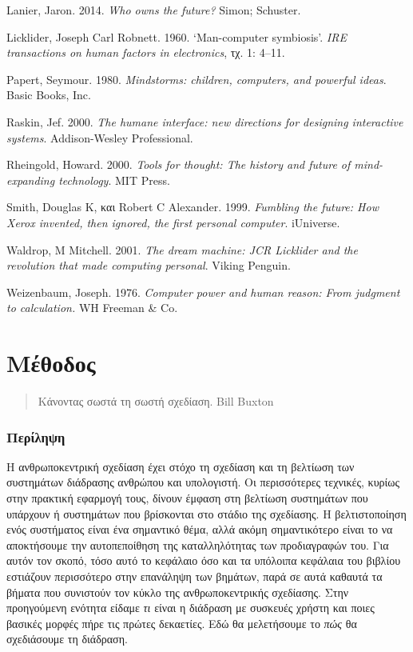 \documentclass[
]{article}
\begin{document}
Lanier, Jaron. 2014. \emph{Who owns the future?} Simon; Schuster.

Licklider, Joseph Carl Robnett. 1960. {`Man-computer symbiosis'}.
\emph{IRE transactions on human factors in electronics}, τχ. 1: 4--11.

Papert, Seymour. 1980. \emph{Mindstorms: children, computers, and
powerful ideas}. Basic Books, Inc.

Raskin, Jef. 2000. \emph{The humane interface: new directions for
designing interactive systems}. Addison-Wesley Professional.

Rheingold, Howard. 2000. \emph{Tools for thought: The history and future
of mind-expanding technology}. MIT Press.

Smith, Douglas K, και Robert C Alexander. 1999. \emph{Fumbling the
future: How Xerox invented, then ignored, the first personal computer}.
iUniverse.

Waldrop, M Mitchell. 2001. \emph{The dream machine: JCR Licklider and
the revolution that made computing personal}. Viking Penguin.

Weizenbaum, Joseph. 1976. \emph{Computer power and human reason: From
judgment to calculation.} WH Freeman \& Co.

\hypertarget{ux3bcux3adux3b8ux3bfux3b4ux3bfux3c2}{%
\section{Μέθοδος}\label{ux3bcux3adux3b8ux3bfux3b4ux3bfux3c2}}

\begin{quote}
Κάνοντας σωστά τη σωστή σχεδίαση. Bill Buxton
\end{quote}

\hypertarget{ux3c0ux3b5ux3c1ux3afux3bbux3b7ux3c8ux3b7}{%
\subsubsection{Περίληψη}\label{ux3c0ux3b5ux3c1ux3afux3bbux3b7ux3c8ux3b7}}

Η ανθρωποκεντρική σχεδίαση έχει στόχο τη σχεδίαση και τη βελτίωση των
συστημάτων διάδρασης ανθρώπου και υπολογιστή. Οι περισσότερες τεχνικές,
κυρίως στην πρακτική εφαρμογή τους, δίνουν έμφαση στη βελτίωση
συστημάτων που υπάρχουν ή συστημάτων που βρίσκονται στο στάδιο της
σχεδίασης. Η βελτιστοποίηση ενός συστήματος είναι ένα σημαντικό θέμα,
αλλά ακόμη σημαντικότερο είναι το να αποκτήσουμε την αυτοπεποίθηση της
καταλληλότητας των προδιαγραφών του. Για αυτόν τον σκοπό, τόσο αυτό το
κεφάλαιο όσο και τα υπόλοιπα κεφάλαια του βιβλίου εστιάζουν περισσότερο
στην επανάληψη των βημάτων, παρά σε αυτά καθαυτά τα βήματα που συνιστούν
τον κύκλο της ανθρωποκεντρικής σχεδίασης. Στην προηγούμενη ενότητα
είδαμε \emph{τι} είναι η διάδραση με συσκευές χρήστη και ποιες βασικές
μορφές πήρε τις πρώτες δεκαετίες. Εδώ θα μελετήσουμε το \emph{πώς} θα
σχεδιάσουμε τη διάδραση.
\end{document}
